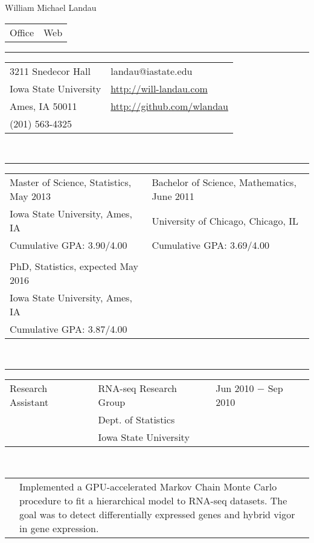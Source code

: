 \documentclass{article}
\newcommand{\q}{$\quad$ \newline}
\newcommand{\vl}{4.25}
\newcommand{\wl}{8.4}
\newcommand{\ww}{13}
\newcommand{\myrule}{\noindent \rule{\textwidth}{1pt}}
\begin{document}
\begin{center}
\LARGE William Michael Landau
\end{center}

\noindent \begin{tabular}{@{}p{13cm}l@{}}
\LARGE Office & \LARGE Web 
\end{tabular}

\myrule

\noindent \begin{tabular}{@{}p{13cm}l@{}}
3211 Snedecor Hall & landau@iastate.edu \\
Iowa State University & \href{http://will-landau.com/}{http://will-landau.com} \\
Ames, IA 50011 & \href{http://github.com/wlandau}{http://github.com/wlandau} \\
(201) 563-4325
\end{tabular} \q \q \q


\myrule

\noindent \begin{tabular}{@{}p{9cm}l@{}}
Master of Science, Statistics, May 2013 &  Bachelor of Science, Mathematics, June 2011   \\
 Iowa State University, Ames, IA  & University of Chicago, Chicago, IL  \\ 
Cumulative GPA: 3.90/4.00 & Cumulative GPA: 3.69/4.00 \\
 & \\
PhD, Statistics, expected May 2016 & \\
Iowa State University, Ames, IA  & \\
Cumulative GPA: 3.87/4.00 \\
\end{tabular} \q \q \q


\myrule

\noindent \begin{tabular}{@{}p{\vl cm}p{\wl cm}l@{}}
Research Assistant & RNA-seq Research Group & Jun 2010 $-$ Sep 2010  \\ 
 &Dept. of Statistics&  \\ 
 &Iowa State University&
\end{tabular} \q \q

\noindent \begin{tabular}{@{}p{\vl cm}p{\ww cm}@{}}
&Implemented a GPU-accelerated Markov Chain Monte Carlo
procedure to fit a hierarchical model to RNA-seq datasets. The goal was to detect 
differentially expressed genes and hybrid vigor in gene expression.
\end{tabular} \q \q
\end{document}

